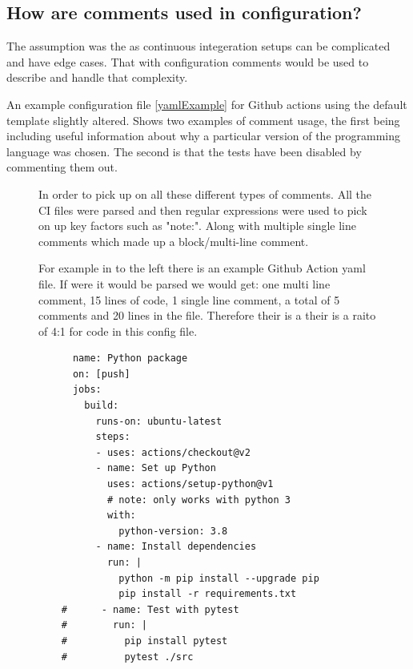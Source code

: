 \documentclass[twoside,12pt,titlepage,a4paper]{article}
\begin{document}
\subsection{How are comments used in configuration?}
\vspace*{-0.05in}
The assumption was the as continuous integeration setups can be complicated and have edge cases. That with configuration comments would be used to describe and handle that complexity.

An example configuration file \ref{yamlExample} for Github actions using the default template slightly altered. Shows two examples of comment usage, the first being including useful information about why a particular version of the programming language was chosen. The second is that the tests have been disabled by commenting them out. 



\begin{figure}[!htbp]
  \centering
  \begin{minipage}[t]{.48\textwidth}
    In order to pick up on all these different types of comments. All the CI files were parsed and then regular expressions were used to pick on up key factors such as "note:". Along with multiple single line comments which made up a block/multi-line comment.

    For example in to the left there is an example Github Action yaml file. If were it would be parsed we would get: one multi line comment, 15 lines of code, 1 single line comment, a total of 5 comments and 20 lines in the file. Therefore their is a their is a raito of 4:1 for code in this config file.
  \end{minipage}%
  \hfill
  \begin{minipage}[t]{.48\textwidth}
    \begin{verbatim}
      name: Python package
      on: [push]
      jobs:
        build:
          runs-on: ubuntu-latest
          steps:
          - uses: actions/checkout@v2
          - name: Set up Python
            uses: actions/setup-python@v1
            # note: only works with python 3
            with:
              python-version: 3.8
          - name: Install dependencies
            run: |
              python -m pip install --upgrade pip
              pip install -r requirements.txt
    #      - name: Test with pytest
    #        run: |
    #          pip install pytest
    #          pytest ./src
      \end{verbatim}
  \end{minipage}
\end{figure}
\end{document}
